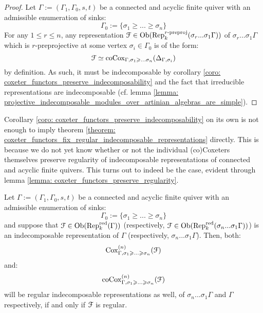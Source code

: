                 \begin{proof}
                    Let $\Gamma := (\Gamma_1, \Gamma_0, s, t)$ be a connected and acyclic finite quiver with an admissible enumeration of sinks:
                        $$\Gamma_0 := \{\sigma_1 \geq ... \geq \sigma_n\}$$
                    For any $1 \leq r \leq n$, any representation $\mathcal{F} \in \mathrm{Ob}(\mathrm{Rep}_k^{r\text{-}\mathrm{preproj}}(\sigma_r ... \sigma_1 \Gamma))$ of $\sigma_r ... \sigma_1 \Gamma$ which is $r$-preprojective at some vertex $\sigma_i \in \Gamma_0$ is of the form:
                        $$\mathcal{F} \simeq \mathrm{co}\mathrm{Cox}_{\Gamma, \sigma_1 \geqslant ... \sigma_n}(\Delta_{\Gamma, \sigma_i})$$
                    by definition. As such, it must be indecomposable by corollary \ref{coro: coxeter_functors_preserve_indecomposability} and the fact that irreducible representations are indecomposable (cf. lemma \ref{lemma: projective_indecomposable_modules_over_artinian_algebras_are_simple}).
                \end{proof}
            \begin{remark}
                Corollary \ref{coro: coxeter_functors_preserve_indecomposability} on its own is not enough to imply theorem \ref{theorem: coxeter_functors_fix_regular_indecomposable_representations} directly. This is because we do not yet know whether or not the individual (co)Coxeters themselves preserve regularity of indecomposable representations of connected and acyclic finite quivers. This turns out to indeed be the case, evident through lemma \ref{lemma: coxeter_functors_preserve_regularity}.
            \end{remark}
            \begin{lemma} \label{lemma: coxeter_functors_preserve_regularity}
                Let $\Gamma := (\Gamma_1, \Gamma_0, s, t)$ be a connected and acyclic finite quiver with an admissible enumeration of sinks:
                    $$\Gamma_0 := \{\sigma_1 \geq ... \geq \sigma_n\}$$
                and suppose that $\mathcal{F} \in \mathrm{Ob}(\mathrm{Rep}_k^{\mathrm{red}}(\Gamma))$ (respectively, $\mathcal{F} \in \mathrm{Ob}(\mathrm{Rep}_k^{\mathrm{red}}(\sigma_n ... \sigma_1 \Gamma))$) is an indecomposable representation of $\Gamma$ (respectively, $\sigma_n ... \sigma_1 \Gamma$). Then, both:
                    $$\mathrm{Cox}_{\Gamma, \sigma_1 \geqslant ...\geqslant \sigma_n}^{(n)}(\mathcal{F})$$
                and:
                    $$\mathrm{co}\mathrm{Cox}_{\Gamma, \sigma_1 \geqslant ...\geqslant \sigma_n}^{(n)}(\mathcal{F})$$
                will be regular indecomposable representations as well, of $\sigma_n ... \sigma_1 \Gamma$ and $\Gamma$ respectively, if and only if $\mathcal{F}$ is regular.
            \end{lemma}
